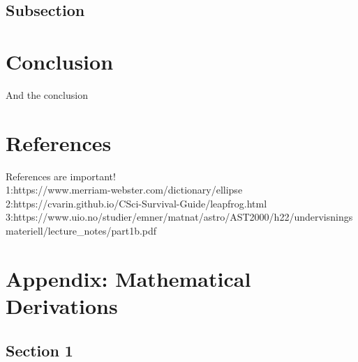 \documentclass[reprint,english,notitlepage]{revtex4-2}
\begin{document}
	\subsection{Subsection}

\section{Conclusion}
And the conclusion


\section{References}
References are important!\\
1:\:https://www.merriam-webster.com/dictionary/ellipse\\
2:\:https://cvarin.github.io/CSci-Survival-Guide/leapfrog.html\\
3:\:https://www.uio.no/studier/emner/matnat/astro/AST2000/h22/undervisningsmateriell/lecture_notes/part1b.pdf

\section{Appendix: Mathematical Derivations}
	\subsection{Section 1}
	\begin{align*}

	\end{align*}
\end{document}
